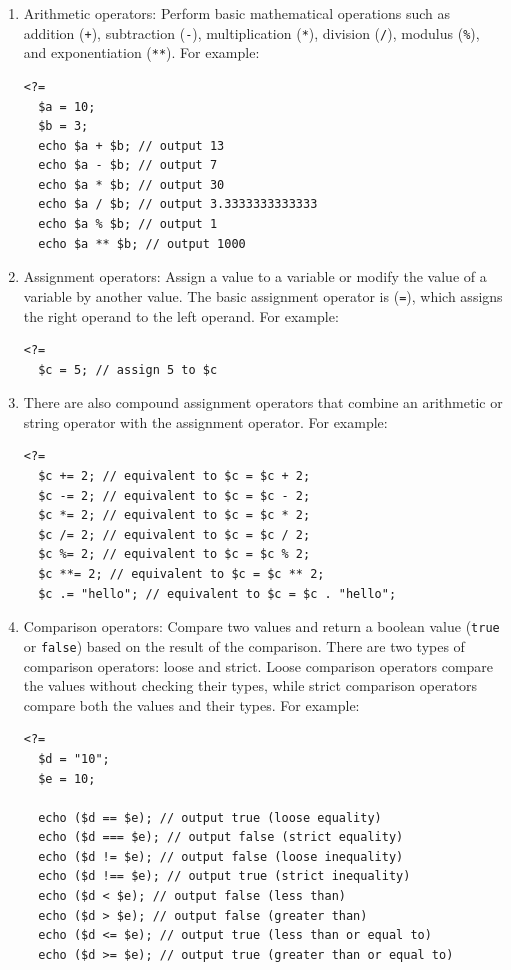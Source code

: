 \documentclass[11pt]{article}
\begin{document}
\begin{enumerate}
\item Arithmetic operators: Perform basic mathematical operations such as
addition (\texttt{+}), subtraction (\texttt{-}), multiplication (\texttt{*}), division
(\texttt{/}), modulus (\texttt{\%}), and exponentiation (\texttt{**}). For example:

\begin{verbatim}
<?=
  $a = 10;
  $b = 3;
  echo $a + $b; // output 13
  echo $a - $b; // output 7
  echo $a * $b; // output 30
  echo $a / $b; // output 3.3333333333333
  echo $a % $b; // output 1
  echo $a ** $b; // output 1000
\end{verbatim}

\item Assignment operators: Assign a value to a variable or modify the
value of a variable by another value. The basic assignment operator
is (\texttt{=}), which assigns the right operand to the left operand. For
example:

\begin{verbatim}
<?=
  $c = 5; // assign 5 to $c
\end{verbatim}

\item There are also compound assignment operators that combine an
arithmetic or string operator with the assignment operator. For
example:

\begin{verbatim}
<?=
  $c += 2; // equivalent to $c = $c + 2;
  $c -= 2; // equivalent to $c = $c - 2;
  $c *= 2; // equivalent to $c = $c * 2;
  $c /= 2; // equivalent to $c = $c / 2;
  $c %= 2; // equivalent to $c = $c % 2;
  $c **= 2; // equivalent to $c = $c ** 2;
  $c .= "hello"; // equivalent to $c = $c . "hello";
\end{verbatim}

\item Comparison operators: Compare two values and return a boolean value
(\texttt{true} or \texttt{false}) based on the result of the comparison. There are
two types of comparison operators: loose and strict. Loose comparison
operators compare the values without checking their types, while
strict comparison operators compare both the values and their types.
For example:

\begin{verbatim}
<?=
  $d = "10";
  $e = 10;

  echo ($d == $e); // output true (loose equality)
  echo ($d === $e); // output false (strict equality)
  echo ($d != $e); // output false (loose inequality)
  echo ($d !== $e); // output true (strict inequality)
  echo ($d < $e); // output false (less than)
  echo ($d > $e); // output false (greater than)
  echo ($d <= $e); // output true (less than or equal to)
  echo ($d >= $e); // output true (greater than or equal to)
\end{verbatim}


\end{enumerate}
\end{document}
